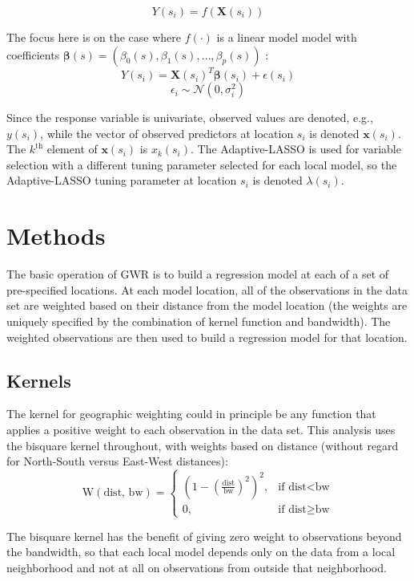 \documentclass[authoryear, review, 11pt]{elsarticle}
\begin{document}
	\[
		Y(s_i) = f \left(\bm{X}(s_i) \right) %
	\]
	
	The focus here is on the case where $f(\cdot)$ is a linear model model with coefficients $\bm{\beta}(s) = (\beta_0(s), \beta_1(s), \dots, \beta_p(s))$ :\\
	\[
		Y(s_i) = \bm{X}(s_i)^T \bm{\beta}(s_i) + \epsilon(s_i)
	\]
	\[
		\epsilon_i \sim \bm{\mathcal{N}} \left( 0, \sigma_i^2 \right)
	\]
	
	Since the response variable is univariate, observed values are denoted, e.g., $y(s_i)$, while the vector of observed predictors at location $s_i$ is denoted $\bm{x}(s_i)$. The $k^{\text{th}}$ element of $\bm{x}(s_i)$ is $x_k(s_i)$. The Adaptive-LASSO is used for variable selection with a different tuning parameter selected for each local model, so the Adaptive-LASSO tuning parameter at location $s_i$ is denoted $\lambda(s_i)$.\\ 
	

\section{Methods}
	The basic operation of GWR is to build a regression model at each of a set of pre-specified locations. At each model location, all of the observations in the data set are weighted based on their distance from the model location (the weights are uniquely specified by the combination of kernel function and bandwidth). The weighted observations are then used to build a regression model for that location.\\
	
	\subsection{Kernels}
		The kernel for geographic weighting could in principle be any function that applies a positive weight to each observation in the data set. This analysis uses the bisquare kernel throughout, with weights based on distance (without regard for North-South versus East-West distances):
		\[
			\text{W}(\text{dist, bw}) = \begin{cases} (1-(\frac{\text{dist}}{\text{bw}})^2)^2, & \mbox{if dist} < \mbox{bw} \\
			0, & \mbox{if dist} \ge \mbox{bw} \end{cases}
		\]
		
		The bisquare kernel has the benefit of giving zero weight to observations beyond the bandwidth, so that each local model depends only on the data from a local neighborhood and not at all on observations from outside that neighborhood.\\
		
\end{document}
